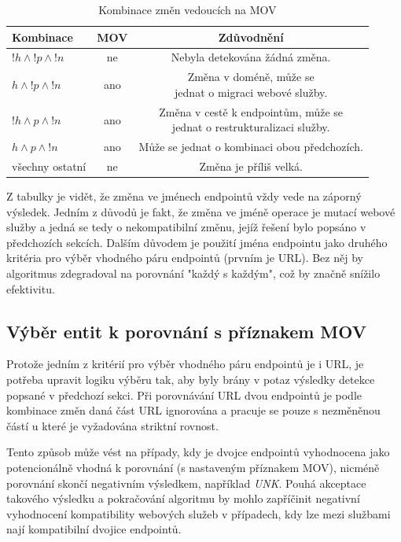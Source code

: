 \documentclass[czech,DP]{thesiskiv}
\begin{document}
\begin{table}[h]
	\begin{tabular}{|l|c|c|}
		\hline
		Kombinace & MOV & Zdůvodnění \\
		\hline
		\hline
		$!h \land !p \land !n$ & ne & Nebyla detekována žádná změna. \\
		\hline
		$h \land !p \land !n$ & ano & \makecell{Změna v doméně, může se \\jednat o migraci webové služby.} \\
		\hline
		$!h \land p \land !n$ & ano & \makecell{Změna v cestě k endpointům, může se \\ jednat o restrukturalizaci služby.} \\
		\hline
		$h \land p \land !n$ & ano & Může se jednat o kombinaci obou předchozích. \\
		\hline
		všechny ostatní & ne & Změna je příliš velká. \\
		\hline
	\end{tabular}
	\caption{Kombinace změn vedoucích na MOV}
	\label{tab:mov-explanation}
\end{table}

Z tabulky je vidět, že změna ve jménech endpointů vždy vede na záporný výsledek. Jedním z důvodů je fakt, že změna ve jméně operace je mutací webové služby a jedná se tedy o nekompatibilní změnu, jejíž řešení bylo popsáno v předchozích sekcích. Dalším důvodem je použití jména endpointu jako druhého kritéria pro výběr vhodného páru endpointů (prvním je URL). Bez něj by algoritmus zdegradoval na porovnání "každý s každým",  což by značně snížilo efektivitu.   

\subsection{Výběr entit k porovnání s příznakem MOV}

Protože jedním z kritérií pro výběr vhodného páru endpointů je i URL, je potřeba upravit logiku výběru tak, aby byly brány v potaz výsledky detekce popsané v předchozí sekci. Při porovnávání URL dvou endpointů je podle kombinace změn daná část URL ignorována a pracuje se pouze s nezměněnou částí u které je vyžadována striktní rovnost.

Tento způsob může vést na případy, kdy je dvojce endpointů vyhodnocena jako potencionálně vhodná k porovnání (s nastaveným příznakem MOV), nicméně porovnání skončí negativním výsledkem, například \textit{UNK}. Pouhá akceptace takového výsledku a pokračování algoritmu by mohlo zapříčinit negativní vyhodnocení kompatibility webových služeb v případech, kdy lze mezi službami nají kompatibilní dvojice endpointů.
\end{document}

